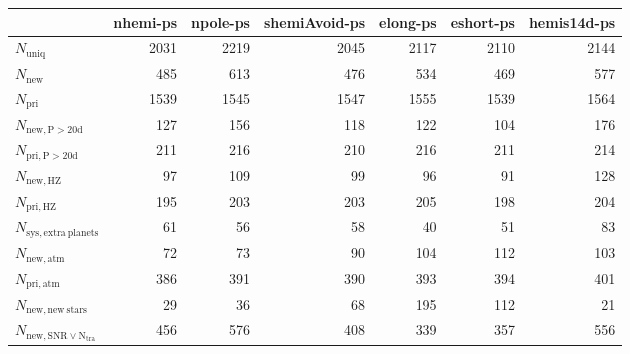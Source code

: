 \begin{tabular}{lrrrrrr}
\toprule
{} &  nhemi-ps &  npole-ps &  shemiAvoid-ps &  elong-ps &  eshort-ps &  hemis14d-ps \\
\midrule
$N_{\mathrm{uniq}}$                &      2031 &      2219 &           2045 &      2117 &       2110 &         2144 \\
$N_{\mathrm{new}}$                 &       485 &       613 &            476 &       534 &        469 &          577 \\
$N_{\mathrm{pri}}$                 &      1539 &      1545 &           1547 &      1555 &       1539 &         1564 \\
$N_{\mathrm{new,P>20d}}$           &       127 &       156 &            118 &       122 &        104 &          176 \\
$N_{\mathrm{pri,P>20d}}$           &       211 &       216 &            210 &       216 &        211 &          214 \\
$N_{\mathrm{new,HZ}}$              &        97 &       109 &             99 &        96 &         91 &          128 \\
$N_{\mathrm{pri,HZ}}$              &       195 &       203 &            203 &       205 &        198 &          204 \\
$N_{\mathrm{sys,extra\ planets}}$  &        61 &        56 &             58 &        40 &         51 &           83 \\
$N_{\mathrm{new,atm}}$             &        72 &        73 &             90 &       104 &        112 &          103 \\
$N_{\mathrm{pri,atm}}$             &       386 &       391 &            390 &       393 &        394 &          401 \\
$N_{\mathrm{new,new\ stars}}$      &        29 &        36 &             68 &       195 &        112 &           21 \\
$N_{\mathrm{new,SNR\lor N_{tra}}}$ &       456 &       576 &            408 &       339 &        357 &          556 \\
\bottomrule
\end{tabular}
